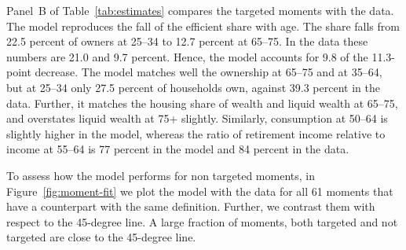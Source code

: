 Panel~B of Table~\ref{tab:estimates} compares the targeted moments with the data. The model
reproduces the fall of the efficient share with age. The share falls from
22.5 percent of owners at 25--34 to 12.7 percent at 65--75. In the data these numbers are 21.0 and
9.7 percent. Hence,  the model accounts for 9.8 of the 11.3-point decrease.
The model matches well the ownership at 65--75 and at 35--64,
but at 25--34 only 27.5 percent of households own, against 39.3 percent in
the data. Further, it matches the housing share of wealth and liquid wealth at
65--75, and overstates liquid wealth at 75+ slightly. Similarly, consumption at
50--64 is slightly higher in the model, whereas the ratio of retirement income relative to income at 55--64 is 77 percent in the  model and 84 percent in the data.

To assess how the model performs for non targeted moments, in Figure~\ref{fig:moment-fit} we plot the model with the data for all 61
moments that have a counterpart with the same definition. Further, we contrast them with respect to the 45-degree line. A large fraction of moments, both targeted and not targeted are close to the 45-degree line. 
